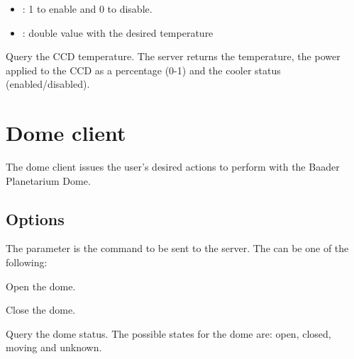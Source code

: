 \documentclass[a4paper,english]{article}
\begin{document}
\begin{Description}
	\begin{itemize}
		\item {}: 1 to enable and 0 to disable.
		\item {}: double value with the desired temperature
	\end{itemize}
	
\item[\Arg{gettemp}] Query the CCD temperature. The server returns the temperature, the power applied to the CCD as a percentage (0-1) and the cooler status (enabled/disabled).

	   
	
\end{Description}


\section{Dome client}

The dome client issues the user's desired actions to perform with the Baader Planetarium Dome. \\

   

   


\subsection{Options}

The  parameter is the command to be sent to the server. The  can be one of the following:

\begin{Description}\setlength{\itemsep}{0cm}
\item[\Arg{open}] Open the dome. 

	   
	
\item[\Arg{close}] Close the dome.

	   
	
\item[\Arg{status}] Query the dome status. The possible states for the dome are: open, closed, moving and unknown.

	   
	
\end{Description}
\end{document}
